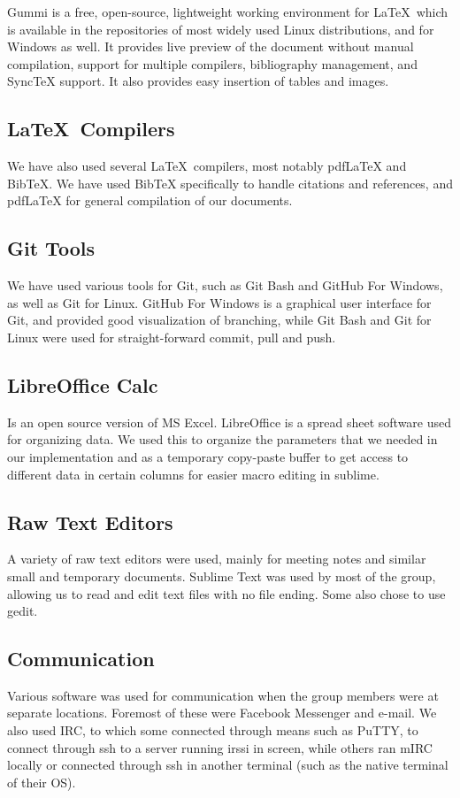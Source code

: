 Gummi is a free, open-source, lightweight working environment for \LaTeX \ which is available in the repositories of most widely used Linux distributions, and for Windows as well. It provides live preview of the document without manual compilation, support for multiple compilers, bibliography management, and SyncTeX support. It also provides easy insertion of tables and images.

\subsection{\LaTeX \ Compilers}
We have also used several \LaTeX \ compilers, most notably pdfLaTeX and BibTeX. We have used BibTeX specifically to handle citations and references, and pdfLaTeX for general compilation of our documents.

\subsection{Git Tools}
We have used various tools for Git, such as Git Bash and GitHub For Windows, as well as Git for Linux. GitHub For Windows is a graphical user interface for Git, and provided good visualization of branching, while Git Bash and Git for Linux were used for straight-forward commit, pull and push.

\subsection{LibreOffice Calc}
Is an open source version of MS Excel. LibreOffice is a spread sheet software used for organizing data. We used this to organize the parameters that we needed in our implementation and as a temporary copy-paste buffer to get access to different data in certain columns for easier macro editing in sublime.

\subsection{Raw Text Editors}
A variety of raw text editors were used, mainly for meeting notes and similar small and temporary documents. Sublime Text was used by most of the group, allowing us to read and edit text files with no file ending. Some also chose to use gedit.

\subsection{Communication}
Various software was used for communication when the group members were at separate locations. Foremost of these were Facebook Messenger and e-mail. We also used IRC, to which some connected through means such as PuTTY, to connect through ssh to a server running irssi in screen, while others ran mIRC locally or connected through ssh in another terminal (such as the native terminal of their OS).
